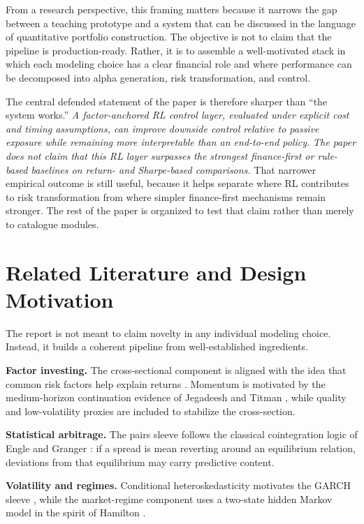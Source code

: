 \documentclass[10pt,twocolumn]{article}
\begin{document}
From a research perspective, this framing matters because it narrows the gap
between a teaching prototype and a system that can be discussed in the language
of quantitative portfolio construction. The objective is not to claim that the
pipeline is production-ready. Rather, it is to assemble a well-motivated stack
in which each modeling choice has a clear financial role and where performance
can be decomposed into alpha generation, risk transformation, and control.

The central defended statement of the paper is therefore sharper than ``the
system works.'' \emph{A factor-anchored RL control layer, evaluated under
explicit cost and timing assumptions, can improve downside control relative to
passive exposure while remaining more interpretable than an end-to-end policy.}
\emph{The paper does not claim that this RL layer surpasses the strongest
finance-first or rule-based baselines on return- and Sharpe-based comparisons.}
That narrower empirical outcome is still useful, because it helps separate
where RL contributes to risk transformation from where simpler finance-first
mechanisms remain stronger. The rest of the paper is organized to test that
claim rather than merely to catalogue modules.

\section{Related Literature and Design Motivation}

The report is not meant to claim novelty in any individual modeling choice.
Instead, it builds a coherent pipeline from well-established ingredients.

\textbf{Factor investing.} The cross-sectional component is aligned with the idea
that common risk factors help explain returns \cite{fama1993}. Momentum is
motivated by the medium-horizon continuation evidence of Jegadeesh and Titman
\cite{jegadeesh1993}, while quality and low-volatility proxies are included to
stabilize the cross-section.

\textbf{Statistical arbitrage.} The pairs sleeve follows the classical
cointegration logic of Engle and Granger \cite{engle1987}: if a spread is mean
reverting around an equilibrium relation, deviations from that equilibrium may
carry predictive content.

\textbf{Volatility and regimes.} Conditional heteroskedasticity motivates the
GARCH sleeve \cite{engle1982,bollerslev1986}, while the market-regime component
uses a two-state hidden Markov model in the spirit of Hamilton \cite{hamilton1989}.
\end{document}
